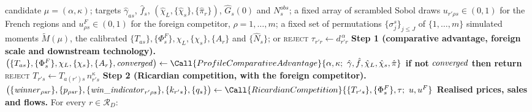\begin{algorithm}[H]
\caption{Simulation of the economy at a candidate $\mu=(\alpha,\kappa)$ (one criterion evaluation)}
\label{alg:simulate}
\small
\begin{algorithmic}[1]
\Require candidate $\mu=(\alpha,\kappa)$; targets $\hat\gamma_{as}$, $\hat f_s$, $(\hat\chi_L,\{\hat\chi_s\},\{\hat\pi_r\})$, $\hat G_s(0)$ and $N^{obs}_s$; a fixed array of scrambled Sobol draws $u_{r'\rho s}\in(0,1)$ for the French regions and $u^F_{\rho s}\in(0,1)$ for the foreign competitor, $\rho=1,\dots,m$; a fixed set of permutations $\{\sigma^s_j\}_{j\le J}$ of $\{1,\dots,m\}$
\Ensure simulated moments $\tilde{M}(\mu)$, the calibrated $\{T_{as}\},\{\Phi^F_s\},\chi_L,\{\chi_s\},\{A_r\}$ and $\{\hat N_s\}$; or \textsc{reject}
\vspace{2pt}
\State $\tau_{r'r}\gets d_{r'r}^{\,\alpha}$
\vspace{2pt}
\State \textbf{Step 1 (comparative advantage, foreign scale and downstream technology).}
\State \quad $\bigl(\{T_{as}\},\{\Phi^F_s\},\chi_L,\{\chi_s\},\{A_r\},\var{converged}\bigr)\gets\Call{ProfileComparativeAdvantage}{\alpha,\kappa;\ \hat\gamma,\hat f,\hat\chi_L,\hat\chi_s,\hat\pi}$
\State \textbf{if not} $\mathit{converged}$ \textbf{then return} \textsc{reject}
\State $T_{r's}\gets T_{a(r')s}\,n_{r's}^{\kappa}$
\vspace{2pt}
\State \textbf{Step 2 (Ricardian competition, with the foreign competitor).}
\State \quad $\bigl(\{\var{winner}_{\rho sr}\},\{p_{\rho sr}\},\{\var{win\_indicator}_{r'\rho s}\},\{k_{r's}\},\{q_s\}\bigr)\gets\Call{RicardianCompetition}{\{T_{r's}\},\{\Phi^F_s\},\tau;\ u,u^F}$
\vspace{2pt}
\State \textbf{Realised prices, sales and flows.} For every $r\in\mathcal{R}_D$:

\end{algorithmic}
\end{algorithm}
